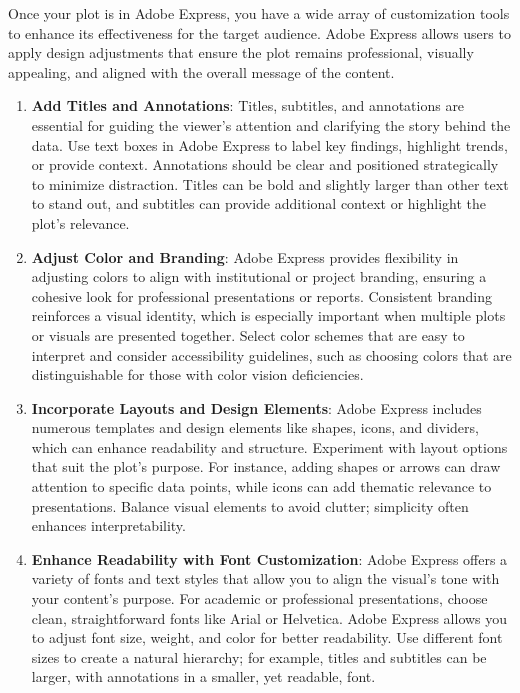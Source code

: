 \documentclass[
]{book}
\begin{document}
Once your plot is in Adobe Express, you have a wide array of customization tools to enhance its effectiveness for the target audience. Adobe Express allows users to apply design adjustments that ensure the plot remains professional, visually appealing, and aligned with the overall message of the content.

\begin{enumerate}
\def\labelenumi{\arabic{enumi}.}
\item
  \textbf{Add Titles and Annotations}: Titles, subtitles, and annotations are essential for guiding the viewer's attention and clarifying the story behind the data. Use text boxes in Adobe Express to label key findings, highlight trends, or provide context. Annotations should be clear and positioned strategically to minimize distraction. Titles can be bold and slightly larger than other text to stand out, and subtitles can provide additional context or highlight the plot's relevance.
\item
  \textbf{Adjust Color and Branding}: Adobe Express provides flexibility in adjusting colors to align with institutional or project branding, ensuring a cohesive look for professional presentations or reports. Consistent branding reinforces a visual identity, which is especially important when multiple plots or visuals are presented together. Select color schemes that are easy to interpret and consider accessibility guidelines, such as choosing colors that are distinguishable for those with color vision deficiencies.
\item
  \textbf{Incorporate Layouts and Design Elements}: Adobe Express includes numerous templates and design elements like shapes, icons, and dividers, which can enhance readability and structure. Experiment with layout options that suit the plot's purpose. For instance, adding shapes or arrows can draw attention to specific data points, while icons can add thematic relevance to presentations. Balance visual elements to avoid clutter; simplicity often enhances interpretability.
\item
  \textbf{Enhance Readability with Font Customization}: Adobe Express offers a variety of fonts and text styles that allow you to align the visual's tone with your content's purpose. For academic or professional presentations, choose clean, straightforward fonts like Arial or Helvetica. Adobe Express allows you to adjust font size, weight, and color for better readability. Use different font sizes to create a natural hierarchy; for example, titles and subtitles can be larger, with annotations in a smaller, yet readable, font.

\end{enumerate}
\end{document}
